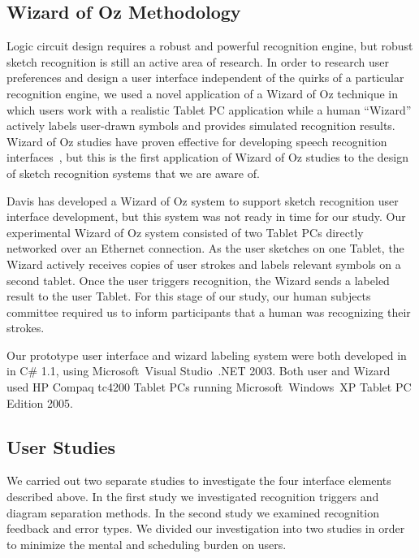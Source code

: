 \documentclass{egpubl}
\begin{document}



\subsection{Wizard of Oz Methodology}
Logic circuit design requires a robust and powerful recognition
engine, but robust sketch recognition is still an active area of
research.  In order to research user preferences and design a user
interface independent of the quirks of a particular recognition
engine, we used a novel application of a Wizard of Oz technique in
which users work with a realistic Tablet PC application while a human
``Wizard'' actively labels user-drawn symbols and provides simulated
recognition results.  Wizard of Oz studies have proven effective for
developing speech recognition interfaces~\cite{169968,354406}, but
this is the first application of Wizard of Oz studies to the design of
sketch recognition systems that we are aware of.

Davis has developed a Wizard of Oz system to support sketch
recognition user interface development\cite{Davis2005SketchWizard},
but this system was not ready in time for our study.  Our experimental
Wizard of Oz system consisted of two Tablet PCs directly networked
over an Ethernet connection.  As the user sketches on one Tablet, the
Wizard actively receives copies of user strokes and labels relevant
symbols on a second tablet.  Once the user triggers recognition, the
Wizard sends a labeled result to the user Tablet.  For this stage of
our study, our human subjects committee required us to inform
participants that a human was recognizing their strokes.

Our prototype user interface and wizard labeling system were both
developed in in C\# 1.1, using Microsoft\textregistered \ Visual
Studio\textregistered \ .NET 2003.  Both user and Wizard used HP
Compaq tc4200 Tablet PCs running Microsoft\textregistered \
Windows\textregistered \ XP Tablet PC Edition 2005.


\subsection{User Studies}
We carried out two separate studies to investigate the four interface
elements described above. In the first study we investigated
recognition triggers and diagram separation methods.  In the second
study we examined recognition feedback and error types. We divided our
investigation into two studies in order to minimize the mental and
scheduling burden on users.
\end{document}
